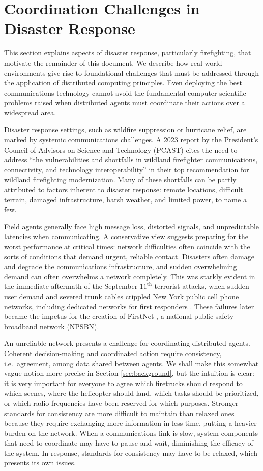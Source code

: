 \documentclass[]             %
{NASA}                       %
\theoremstyle{definition}
\begin{document}
\section{Coordination Challenges in Disaster Response}
\label{sec:disaster-response}
This section explains aspects of disaster response, particularly
firefighting, that motivate the remainder of this document. We
describe how real-world environments give rise to foundational
challenges that must be addressed through the application of
distributed computing principles. Even deploying the best
communications technology cannot avoid the fundamental computer
scientific problems raised when distributed agents must coordinate
their actions over a widespread area.

Disaster response settings, such as wildfire suppression or hurricane
relief, are marked by systemic communications challenges. A 2023
report by the President’s Council of Advisors on Science and
Technology (PCAST) cites the need to address ``the vulnerabilities and
shortfalls in wildland firefighter communications, connectivity, and
technology interoperability'' in their top recommendation
\cite{pcast2023} for wildland firefighting modernization. Many of
these shortfalls can be partly attributed to factors inherent to
disaster response: remote locations, difficult terrain, damaged
infrastructure, harsh weather, and limited power, to name a few.

Field agents generally face high message loss, distorted signals, and
unpredictable latencies when communicating. A conservative view
suggests preparing for the worst performance at critical times:
network difficulties often coincide with the sorts of conditions that
demand urgent, reliable contact. Disasters often damage and degrade
the communications infrastructure, and sudden overwhelming demand can
often overwhelms a network completely. This was starkly evident in the
immediate aftermath of the September $11^\textrm{th}$ terrorist
attacks, when sudden user demand and severed trunk cables crippled New
York public cell phone networks, including dedicated networks for
first responders \cite{2011:Reardon}. These failures later became the
impetus for the creation of FirstNet \cite{2021:firstnet,
2021:firstnet2}, a national public safety broadband network (NPSBN).

An unreliable network presents a challenge for coordinating
distributed agents. Coherent decision-making and coordinated action
require consistency, i.e.~agreement, among data shared between
agents. We shall make this somewhat vague notion more precise in
Section \ref{sec:background}, but the intuition is clear: it is very
important for everyone to agree which firetrucks should respond to
which scenes, where the helicopter should land, which tasks should be
prioritized, or which radio frequencies have been reserved for
which purposes. Stronger standards for consistency are more difficult to
maintain than relaxed ones because they require exchanging more
information in less time, putting a heavier burden on the
network. When a communications link is slow, system components that
need to coordinate may have to pause and wait, diminishing the
efficacy of the system. In response, standards for consistency may have to be relaxed, which presents its own issues.
\end{document}
